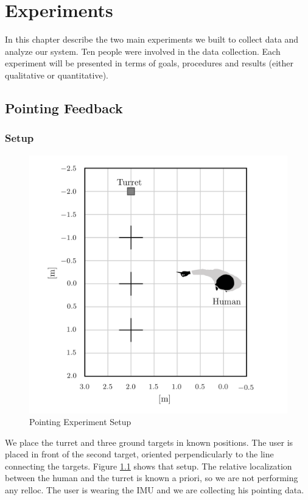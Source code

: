 \chapter{Experiments}
In this chapter describe the two main experiments we built to collect data and analyze our system. Ten people were involved in the data collection. Each experiment will be presented in terms of goals, procedures and results (either qualitative or quantitative).
\section{Pointing Feedback}
\subsection{Setup}
\begin{figure}
	\centering
	\includegraphics[width=\textwidth]{img/pointingExpSetup.png}%
	\caption{Pointing Experiment Setup}
	\label{fig:pointingExpSetup}
\end{figure}
We place the turret and three ground targets in known positions. The user is placed in front of the second target, oriented perpendicularly to the line connecting the targets. Figure \ref{fig:pointingExpSetup} shows that setup. The relative localization between the human and the turret is known a priori, so we are not performing any relloc. The user is wearing the IMU and we are collecting his pointing data.\\
